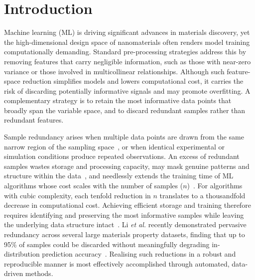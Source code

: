 \documentclass{WileyMSP-template}
\begin{document}
\section{Introduction}

Machine learning (ML) is driving significant advances in materials discovery, yet the high-dimensional design space of nanomaterials often renders model training computationally demanding. Standard pre-processing strategies address this by removing features that carry negligible information, such as those with near-zero variance or those involved in multicollinear relationships. Although such feature-space reduction simplifies models and lowers computational cost, it carries the risk of discarding potentially informative signals and may promote overfitting. A complementary strategy is to retain the most informative data points that broadly span the variable space, and to discard redundant samples rather than redundant features.

Sample redundancy arises when multiple data points are drawn from the same narrow region of the sampling space~\cite{Li2023matDataRedund}, or when identical experimental or simulation conditions produce repeated observations. An excess of redundant samples wastes storage and processing capacity, may mask genuine patterns and structure within the data~\cite{Wang2022bigDataML}, and needlessly extends the training time of ML algorithms whose cost scales with the number of samples ($n$)~\cite{Yu2004MLredund}. For algorithms with cubic complexity, each tenfold reduction in $n$ translates to a thousandfold decrease in computational cost. Achieving efficient storage and training therefore requires identifying and preserving the most informative samples while leaving the underlying data structure intact~\cite{Lin2015representativeData}. Li \textit{et al.} recently demonstrated pervasive redundancy across several large materials property datasets, finding that up to 95\% of samples could be discarded without meaningfully degrading in-distribution prediction accuracy~\cite{Li2023matDataRedund}. Realising such reductions in a robust and reproducible manner is most effectively accomplished through automated, data-driven methods.
\end{document}
